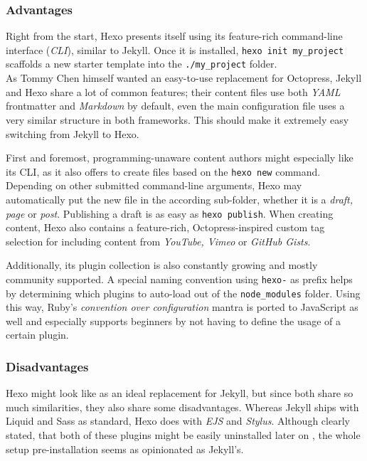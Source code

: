 \subsubsection{Advantages}
Right from the start, Hexo presents itself using its feature-rich command-line interface (\emph{CLI}), similar to Jekyll. Once it is installed, \texttt{hexo init my\_project} scaffolds a new starter template into the \texttt{./my\_project} folder.\\
As Tommy Chen himself wanted an easy-to-use replacement for Octopress, Jekyll and Hexo share a lot of common features; their content files use both \emph{YAML} frontmatter and \emph{Markdown} by default, even the main configuration file uses a very similar structure in both frameworks. This should make it extremely easy switching from Jekyll to Hexo.

First and foremost, programming-unaware content authors might especially like its CLI, as it also offers to create files based on the \texttt{hexo new} command. Depending on other submitted command-line arguments, Hexo may automatically put the new file in the according sub-folder, whether it is a \emph{draft, page} or \emph{post}. Publishing a draft is as easy as \texttt{hexo publish}. When creating content, Hexo also contains a feature-rich, Octopress-inspired custom tag selection for including content from \emph{YouTube, Vimeo} or \emph{GitHub Gists}.

Additionally, its plugin collection is also constantly growing and mostly community supported. A special naming convention using \texttt{hexo-} as prefix helps by determining which plugins to auto-load out of the \texttt{node\_modules} folder. Using this way, Ruby's \emph{convention over configuration} mantra is ported to JavaScript as well and especially supports beginners by not having to define the usage of a certain plugin.

\subsubsection{Disadvantages}
Hexo might look like as an ideal replacement for Jekyll, but since both share so much similarities, they also share some disadvantages. Whereas Jekyll ships with Liquid and Sass as standard, Hexo does with \emph{EJS} and \emph{Stylus}. Although clearly stated, that both of these plugins might be easily uninstalled later on \cite{HexoDocumentationSetup}, the whole setup pre-installation seems as opinionated as Jekyll's.

